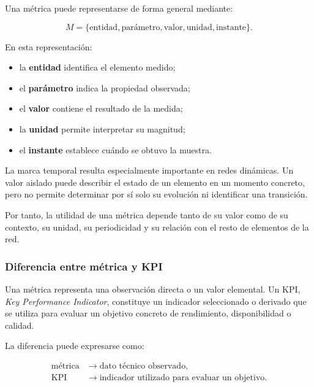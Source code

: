 Una métrica puede representarse de forma general mediante:

\[
    M =
    \{
        \text{entidad},
        \text{parámetro},
        \text{valor},
        \text{unidad},
        \text{instante}
    \}.
\]

En esta representación:

\begin{itemize}
    \item la \textbf{entidad} identifica el elemento medido;

    \item el \textbf{parámetro} indica la propiedad observada;

    \item el \textbf{valor} contiene el resultado de la medida;

    \item la \textbf{unidad} permite interpretar su magnitud;

    \item el \textbf{instante} establece cuándo se obtuvo la muestra.
\end{itemize}

La marca temporal resulta especialmente importante en redes dinámicas.
Un valor aislado puede describir el estado de un elemento en un momento
concreto, pero no permite determinar por sí solo su evolución ni
identificar una transición.

Por tanto, la utilidad de una métrica depende tanto de su valor como de
su contexto, su unidad, su periodicidad y su relación con el resto de
elementos de la red.


\subsubsection*{Diferencia entre métrica y KPI}

Una métrica representa una observación directa o un valor elemental. Un
KPI, \textit{Key Performance Indicator}, constituye un indicador
seleccionado o derivado que se utiliza para evaluar un objetivo concreto
de rendimiento, disponibilidad o calidad.

La diferencia puede expresarse como:

\[
\begin{aligned}
    \text{métrica}
    &\longrightarrow
    \text{dato técnico observado},\\
    \text{KPI}
    &\longrightarrow
    \text{indicador utilizado para evaluar un objetivo}.
\end{aligned}
\]

